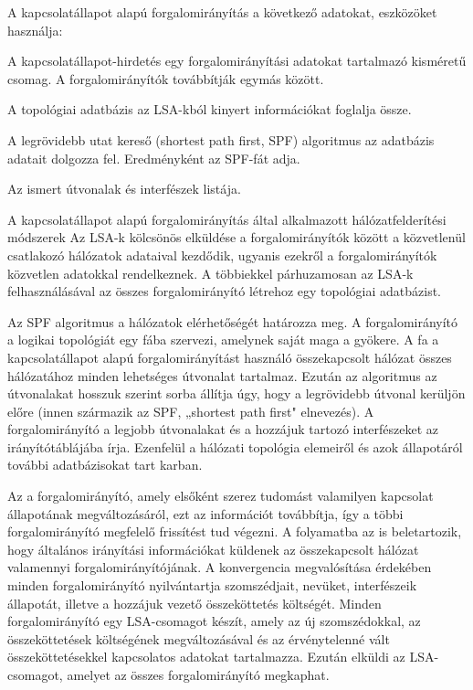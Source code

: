 A kapcsolatállapot alapú forgalomirányítás a következő adatokat, eszközöket használja:
\begin{description}[nosep]
	\item[Kapcsolatállapot-hirdetések (link-state advertisement, LSA)] A kapcsolatállapot-hirdetés egy forgalomirányítási adatokat tartalmazó kisméretű csomag. A forgalomirányítók továbbítják egymás között.
	\item[Topológiai adatbázis] A topológiai adatbázis az LSA-kból kinyert információkat foglalja össze.
	\item[Legrövidebb utat kereső algoritmus] A legrövidebb utat kereső (shortest path first, SPF) algoritmus az adatbázis adatait dolgozza fel. Eredményként az SPF-fát adja.
	\item[Irányítótáblák] Az ismert útvonalak és interfészek listája.
\end{description}

A kapcsolatállapot alapú forgalomirányítás által alkalmazott hálózatfelderítési módszerek
Az LSA-k kölcsönös elküldése a forgalomirányítók között a közvetlenül csatlakozó hálózatok
adataival kezdődik, ugyanis ezekről a forgalomirányítók közvetlen adatokkal rendelkeznek. A
többiekkel párhuzamosan az LSA-k felhasználásával az összes forgalomirányító létrehoz egy
topológiai adatbázist.

Az SPF algoritmus a hálózatok elérhetőségét határozza meg. A forgalomirányító a logikai
topológiát egy fába szervezi, amelynek saját maga a gyökere. A fa a kapcsolatállapot alapú
forgalomirányítást használó összekapcsolt hálózat összes hálózatához minden lehetséges
útvonalat tartalmaz. Ezután az algoritmus az útvonalakat hosszuk szerint sorba állítja úgy,
hogy a legrövidebb útvonal kerüljön előre (innen származik az SPF, „shortest path first"
elnevezés). A forgalomirányító a legjobb útvonalakat és a hozzájuk tartozó interfészeket az
irányítótáblájába írja. Ezenfelül a hálózati topológia elemeiről és azok állapotáról további
adatbázisokat tart karban.

Az a forgalomirányító, amely elsőként szerez tudomást valamilyen kapcsolat állapotának
megváltozásáról, ezt az információt továbbítja, így a többi forgalomirányító megfelelő
frissítést tud végezni. A folyamatba az is beletartozik, hogy általános irányítási információkat
küldenek az összekapcsolt hálózat valamennyi forgalomirányítójának. A konvergencia
megvalósítása érdekében minden forgalomirányító nyilvántartja szomszédjait, nevüket,
interfészeik állapotát, illetve a hozzájuk vezető összeköttetés költségét. Minden
forgalomirányító egy LSA-csomagot készít, amely az új szomszédokkal, az összeköttetések
költségének megváltozásával és az érvénytelenné vált összeköttetésekkel kapcsolatos adatokat
tartalmazza. Ezután elküldi az LSA-csomagot, amelyet az összes forgalomirányító
megkaphat.

